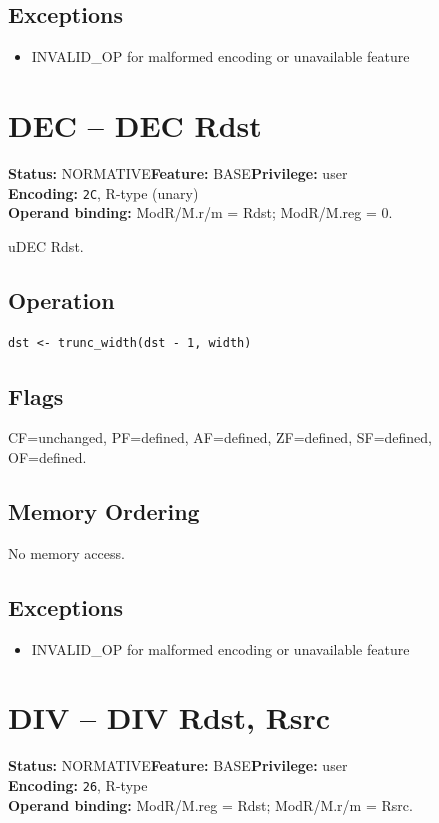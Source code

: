 \documentclass[10pt]{article}
\begin{document}
\subsection*{Exceptions}
\begin{itemize}
\item INVALID\_OP for malformed encoding or unavailable feature
\end{itemize}
\clearpage

\section{DEC -- DEC Rdst}
\textbf{Status:} NORMATIVE\quad \textbf{Feature:} BASE\quad \textbf{Privilege:} user\\
\textbf{Encoding:} \texttt{2C}, R-type (unary)\\
\textbf{Operand binding:} ModR/M.r/m = Rdst; ModR/M.reg = 0.

uDEC Rdst.

\subsection*{Operation}
\begin{lstlisting}
dst <- trunc_width(dst - 1, width)
\end{lstlisting}
\subsection*{Flags}
CF=unchanged, PF=defined, AF=defined, ZF=defined, SF=defined, OF=defined.
\subsection*{Memory Ordering}
No memory access.
\subsection*{Exceptions}
\begin{itemize}
\item INVALID\_OP for malformed encoding or unavailable feature
\end{itemize}
\clearpage

\section{DIV -- DIV Rdst, Rsrc}
\textbf{Status:} NORMATIVE\quad \textbf{Feature:} BASE\quad \textbf{Privilege:} user\\
\textbf{Encoding:} \texttt{26}, R-type\\
\textbf{Operand binding:} ModR/M.reg = Rdst; ModR/M.r/m = Rsrc.
\end{document}
